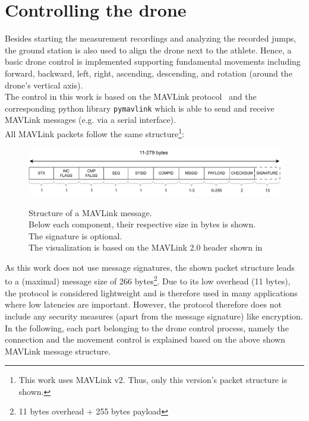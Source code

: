 \section{Controlling the drone}\label{sec:4_drone_ctrl}
Besides starting the measurement recordings and analyzing the recorded jumps,
the ground station is also used to align the drone next to the athlete.
Hence, a basic drone control is implemented supporting fundamental movements
including forward, backward, left, right, ascending, descending, and rotation
(around the drone's vertical axis).\\
The control in this work is based on the MAVLink
protocol~\cite{koubaaMicroAirVehicle2019} and the
corresponding python library \texttt{pymavlink} which is able to send and
receive MAVLink messages (e.g. via a serial interface).\\
All MAVLink packets follow the same structure\footnote{This work uses MAVLink
v2. Thus, only this version's packet structure is shown.}:
\begin{figure}[!h]
    \centering
    \includegraphics[scale=0.7]{mavlink_v2.pdf}
    \label{fig:4_mavlink_message}
    \caption[Structure of a MAVLink message]{Structure of a MAVLink message.\\
    Below each component, their respective size in bytes is shown.\\
    The signature is optional.\\
    The visualization is based on the MAVLink 2.0 header shown
    in~\cite{koubaaMicroAirVehicle2019}}
\end{figure}
\FloatBarrier
\noindent As this work does not use message signatures, the shown packet
structure leads to a (maximal) message size of 266 bytes\footnote{11 bytes
overhead + 255 bytes payload}.
Due to its low overhead (11 bytes), the protocol is considered lightweight and
is therefore used in many applications where low latencies are important.
However, the protocol therefore does not include any security measures (apart
from the message signature) like encryption.\\
In the following, each part belonging to the drone control process, namely
the connection and the movement control is explained based on the above shown
MAVLink message structure.

